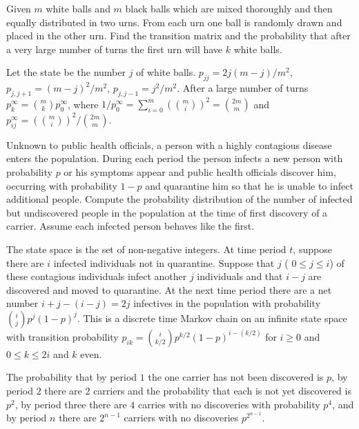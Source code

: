 \documentclass[12pt]{article}
\begin{document}
\begin{exercise}
    Given \( m \) white balls and \( m \) black balls which are mixed
    thoroughly and then equally distributed in two urns.  From each urn
    one ball is randomly drawn and placed in the other urn. Find the
    transition matrix and the probability that after a very large number
    of turns the first urn will have \( k \) white balls.
\end{exercise}
\begin{solution}
    Let the state be the number \( j \) of white balls. \( p_{jj} = 2j(m-j)/m^2
    \), \( p_{j,j+1} = (m-j)^2/m^2 \), \( p_{j,j-1} = j^2/m^2 \).  After
    a large number of turns \( p_k^{\infty} = \binom{m}{k} p_0^{\infty} \),
    where \( 1/p_0^{\infty} =\sum_{i=0}^m \left( \binom{m}{i} \right)^2
    = \binom{2m}{m} \) and \( p_{ij}^{\infty} = \left( \binom{m}{i}
    \right)^2/ \binom{2m}{m} \).
\end{solution}
\begin{exercise}
    Unknown to public health officials, a person with a highly
    contagious disease enters the population.  During each period the
    person infects a new person with probability \( p \) or his symptoms
    appear and public health officials discover him, occurring with
    probability \( 1-p \) and quarantine him so that he is unable to
    infect additional people.  Compute the probability distribution of
    the number of infected but undiscovered people in the population at
    the time of first discovery of a carrier. Assume each infected
    person behaves like the first.
\end{exercise}
\begin{solution}
    The state space is the set of non-negative integers.  At time period
    \( t \), suppose there are \( i \) infected individuals not in
    quarantine. Suppose that \( j \) ( \( 0 \le j \le i \)) of these
    contagious individuals infect another \( j \) individuals and that \(
    i-j \) are discovered and moved to quarantine.  At the next time
    period there are a net number \( i + j - (i-j) = 2j \) infectives in
    the population with probability \( \binom{i}{j}p^j(1-p)^j \).  This
    is a discrete time Markov chain on an infinite state space with
    transition probability \( p_{ik} = \binom{i}{k/2}p^{k/2}(1-p)^{i-(k/2)}
    \) for \( i \ge 0 \) and \( 0 \le k \le 2i \) and \( k \) even.

    The probability that by period \( 1 \) the one carrier has not been
    discovered is \( p \), by period \( 2 \) there are \( 2 \) carriers
    and the probability that each is not yet discovered is \( p^{2} \),
    by period three there are \( 4 \) carries with no discoveries with
    probability \( p^{4} \), and by period \( n \) there are \( 2^{n-1} \)
    carriers with no discoveries \( p^{2^{n-1}} \).
\end{solution}
\end{document}
